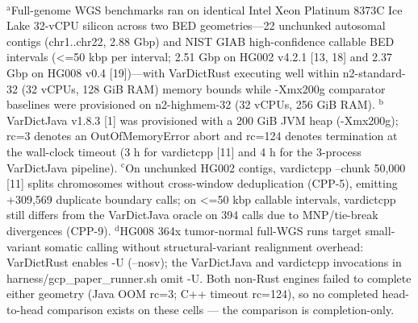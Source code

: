 \begin{table}[htbp]
\\[4pt]\footnotesize{$^{\text{a}}$Full-genome WGS benchmarks ran on identical Intel Xeon Platinum 8373C Ice Lake 32-vCPU silicon across two BED geometries---22 unchunked autosomal contigs (chr1..chr22, 2.88 Gbp) and NIST GIAB high-confidence callable BED intervals (\textless{}=50 kbp per interval; 2.51 Gbp on HG002 v4.2.1 [13, 18] and 2.37 Gbp on HG008 v0.4 [19])---with VarDictRust executing well within n2-standard-32 (32 vCPUs, 128 GiB RAM) memory bounds while -Xmx200g comparator baselines were provisioned on n2-highmem-32 (32 vCPUs, 256 GiB RAM). $^{\text{b}}$VarDictJava v1.8.3 [1] was provisioned with a 200 GiB JVM heap (-Xmx200g); rc=3 denotes an OutOfMemoryError abort and rc=124 denotes termination at the wall-clock timeout (3 h for vardictcpp [11] and 4 h for the 3-process VarDictJava pipeline). $^{\text{c}}$On unchunked HG002 contigs, vardictcpp --chunk 50,000 [11] splits chromosomes without cross-window deduplication (CPP-5), emitting +309,569 duplicate boundary calls; on \textless{}=50 kbp callable intervals, vardictcpp still differs from the VarDictJava oracle on 394 calls due to MNP/tie-break divergences (CPP-9). $^{\text{d}}$HG008 364x tumor-normal full-WGS runs target small-variant somatic calling without structural-variant realignment overhead: VarDictRust enables -U (--nosv); the VarDictJava and vardictcpp invocations in harness/gcp\_paper\_runner.sh omit -U. Both non-Rust engines failed to complete either geometry (Java OOM rc=3; C++ timeout rc=124), so no completed head-to-head comparison exists on these cells --- the comparison is completion-only.}
\end{table}
